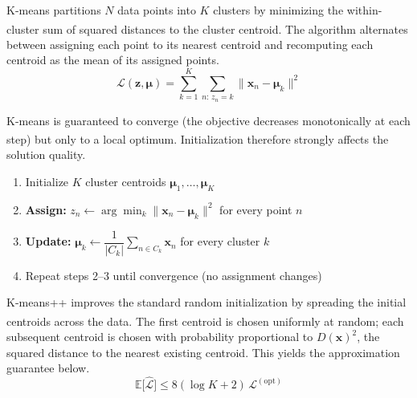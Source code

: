 \begin{tcbitemize}[ skin=sectionraster ]
    \tcbitem[title=K-Means Objective, raster multicolumn=3]
    K-means partitions $N$ data points into $K$ clusters by minimizing the within-cluster sum of squared distances to the cluster centroid\textsuperscript{\cite[][p.166]{iiiCourseMachineLearning}}. The algorithm alternates between assigning each point to its nearest centroid and recomputing each centroid as the mean of its assigned points.
    \tcblower
    \begin{equation}
        \mathcal{L}(\mathbf{z}, \boldsymbol{\mu}) = \sum_{k=1}^{K} \sum_{n:\, z_n = k} \|\mathbf{x}_n - \boldsymbol{\mu}_k\|^2
    \end{equation}

    \tcbitem[title=K-Means Algorithm, raster multicolumn=3]
    K-means is guaranteed to converge (the objective decreases monotonically at each step) but only to a local optimum\textsuperscript{\cite[][pp.~166--168]{iiiCourseMachineLearning}}. Initialization therefore strongly affects the solution quality.
    \tcblower
    \begin{enumerate}
        \item Initialize $K$ cluster centroids $\boldsymbol{\mu}_1, \ldots, \boldsymbol{\mu}_K$
        \item \textbf{Assign:} $z_n \leftarrow \arg\min_k \|\mathbf{x}_n - \boldsymbol{\mu}_k\|^2$ for every point $n$
        \item \textbf{Update:} $\boldsymbol{\mu}_k \leftarrow \dfrac{1}{|C_k|}\displaystyle\sum_{n \in C_k} \mathbf{x}_n$ for every cluster $k$
        \item Repeat steps 2--3 until convergence (no assignment changes)
    \end{enumerate}

    \tcbitem[title=K-Means++ Initialization, raster multicolumn=3]
    K-means++ improves the standard random initialization by spreading the initial centroids across the data\textsuperscript{\cite[][pp.~168--169]{iiiCourseMachineLearning}}. The first centroid is chosen uniformly at random; each subsequent centroid is chosen with probability proportional to $D(\mathbf{x})^2$, the squared distance to the nearest existing centroid. This yields the approximation guarantee below.
    \tcblower
    \begin{equation}
        \mathbb{E}\bigl[\hat{\mathcal{L}}\bigr] \leq 8(\log K + 2)\,\mathcal{L}^{(\mathrm{opt})}
    \end{equation}


\end{tcbitemize}
